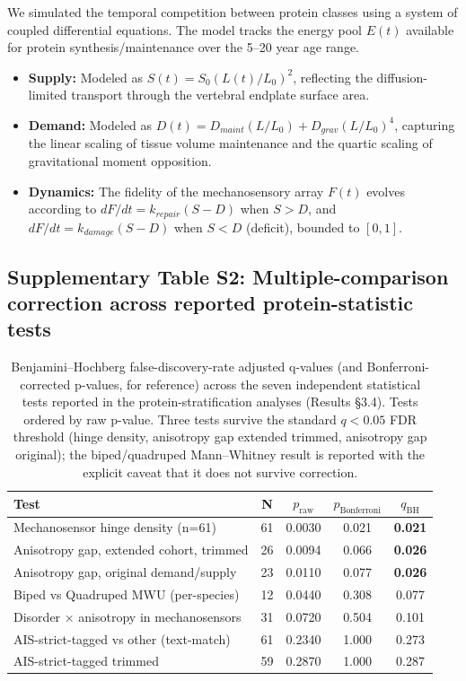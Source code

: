 We simulated the temporal competition between protein classes using a system of coupled differential equations. The model tracks the energy pool $E(t)$ available for protein synthesis/maintenance over the 5--20 year age range.
\begin{itemize}
    \item \textbf{Supply:} Modeled as $S(t) = S_0 (L(t)/L_0)^2$, reflecting the diffusion-limited transport through the vertebral endplate surface area.
    \item \textbf{Demand:} Modeled as $D(t) = D_{maint} (L/L_0) + D_{grav} (L/L_0)^4$, capturing the linear scaling of tissue volume maintenance and the quartic scaling of gravitational moment opposition.
    \item \textbf{Dynamics:} The fidelity of the mechanosensory array $F(t)$ evolves according to $dF/dt = k_{repair}(S - D)$ when $S > D$, and $dF/dt = k_{damage}(S - D)$ when $S < D$ (deficit), bounded to $[0, 1]$.
\end{itemize}


\subsection{Supplementary Table S2: Multiple-comparison correction across reported protein-statistic tests}

\begin{table}[h!]
\centering
\caption{Benjamini--Hochberg false-discovery-rate adjusted q-values (and Bonferroni-corrected p-values, for reference) across the seven independent statistical tests reported in the protein-stratification analyses (Results §3.4). Tests ordered by raw p-value. Three tests survive the standard $q < 0.05$ FDR threshold (hinge density, anisotropy gap extended trimmed, anisotropy gap original); the biped/quadruped Mann--Whitney result is reported with the explicit caveat that it does not survive correction.}
\label{tab:S2}
\small
\begin{tabular}{lcccc}
\toprule
\textbf{Test} & \textbf{N} & \textbf{$p_{\text{raw}}$} & \textbf{$p_{\text{Bonferroni}}$} & \textbf{$q_{\text{BH}}$} \\
\midrule
Mechanosensor hinge density (n=61) & 61 & 0.0030 & 0.021 & \textbf{0.021} \\
Anisotropy gap, extended cohort, trimmed & 26 & 0.0094 & 0.066 & \textbf{0.026} \\
Anisotropy gap, original demand/supply & 23 & 0.0110 & 0.077 & \textbf{0.026} \\
Biped vs Quadruped MWU (per-species) & 12 & 0.0440 & 0.308 & 0.077 \\
Disorder $\times$ anisotropy in mechanosensors & 31 & 0.0720 & 0.504 & 0.101 \\
AIS-strict-tagged vs other (text-match) & 61 & 0.2340 & 1.000 & 0.273 \\
AIS-strict-tagged trimmed & 59 & 0.2870 & 1.000 & 0.287 \\
\bottomrule
\end{tabular}
\end{table}

